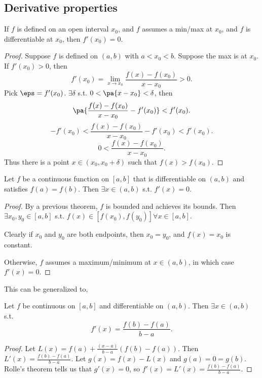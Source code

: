 \documentclass[11pt]{scrartcl}
\numberwithin{equation}{section}
\begin{document}
\subsection{Derivative properties}
\begin{theorem}
    If $f$ is defined on an open interval $x_0$, and $f$ assumes 
    a min/max at $x_0$, and $f$ is differentiable at $x_0$,
    then $f'(x_0) = 0$.
\end{theorem}
\begin{proof}
    Suppose $f$ is defined on $(a,b)$ with $a<x_0<b$. Suppose 
    the max is at $x_0$.
    If $f'(x_0)>0$, then 
    \[
        f'(x_0) = \lim_{x\rightarrow x_0}\frac{f(x)-f(x_0)}{x-x_0}>0.
    \]
    Pick $\eps = f'(x_0)$. $\exists \delta$ s.t. $0<\pa{x-x_0}<\delta$,
    then 
    \[
        \pa{\frac{f(x)-f(x_0)}{x-x_0}-f'(x_0)} < f'(x_0).
    \]
    \[
        -f'(x_0)< \frac{f(x)-f(x_0)}{x-x_0}-f'(x_0)< f'(x_0).
    \]
    \[
        0< \frac{f(x)-f(x_0)}{x-x_0}.
    \]
    Thus there is a point $x \in (x_0,x_0+\delta)$
    such that $f(x)>f(x_0)$.
\end{proof}
\begin{theorem}
    \label{thm:rollesthm}
    Let $f$ be a continuous function on $[a,b]$ that is differentiable on 
    $(a,b)$ and satisfies $f(a)=f(b)$.  Then $\exists x\in(a,b)$ 
    s.t. $f'(x) = 0$.
\end{theorem}
\begin{proof}
    By a previous theorem, $f$ is bounded and achieves its bounds.
    Then $\exists x_0,y_0\in[a,b]$ s.t. $f(x)\in [f(x_0),f(y_0)]
    \forall x\in[a,b]$.

    Clearly if $x_0$ and $y_0$ are both endpoints, then $x_0=y_0$,
    and $f(x) = x_0$ is constant.

    Otherwise, $f$ assumes a maximum/minimum at $x\in(a,b)$,
    in which case $f'(x)=0$.
\end{proof}
This can be generalized to,
\begin{theorem}
    \label{thm:mvt}
    Let $f$ be continuous on $[a,b]$ and differentiable on $(a,b)$.
    Then $\exists x\in(a,b)$ s.t. 
    \[
        f'(x) = \frac{f(b)-f(a)}{b-a}.
    \]
\end{theorem}
\begin{proof}
    Let $L(x) = f(a) + \frac{(x-a)}{b-a}(f(b)-f(a))$.
    Then $L'(x) = \frac{f(b)-f(a)}{b-a}$. Let $g(x) = f(x) - L(x)$ and 
    $g(a)=0=g(b)$. Rolle's theorem tells us that $g'(x)=0$, so 
    $f'(x) = L'(x) = \frac{f(b)-f(a)}{b-a}$.
\end{proof}
\end{document}

